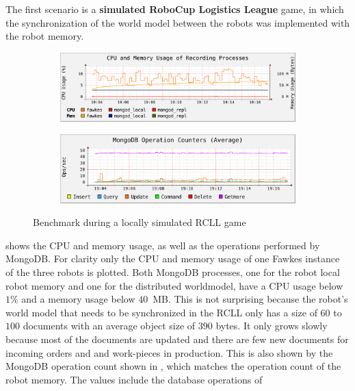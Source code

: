 The
first scenario is a \textbf{simulated RoboCup Logistics League} game, in which
the synchronization of the world model between the robots was
implemented with the robot memory.
\begin{figure}
  \centering
  \begin{subfigure}[b]{1\textwidth}
    \includegraphics[width=\textwidth]{plots/rcll-local/cpu-mem}
    \label{fig:rcll-cpu-mem}
  \end{subfigure}
  \begin{subfigure}[b]{1\textwidth}
    \includegraphics[width=\textwidth]{plots/rcll-local/operations}
    \label{fig:rcll-ops}
  \end{subfigure}
  \caption[Benchmark during a locally simulated RCLL game]{Benchmark during a locally simulated RCLL game}
  \label{fig:rcll-benchmark}
\end{figure}
 shows the CPU and memory usage, as well as
the operations performed by MongoDB. For clarity only the CPU and
memory usage of one Fawkes instance of the three robots is
plotted. Both MongoDB processes, one for the robot local robot memory
and one for the distributed worldmodel, have a CPU usage below $1\%$
and a memory usage below $40$~MB. This is not surprising because the
robot's world model that needs to be synchronized in the RCLL only has
a size of $60$ to $100$ documents with an average object size of $390$
bytes. It only grows slowly because most of the documents are updated
and there are few new documents for incoming orders and and work-pieces
in production. This is also shown by the MongoDB operation count shown
in , which matches the operation count of
the robot memory. The values include the database operations of
